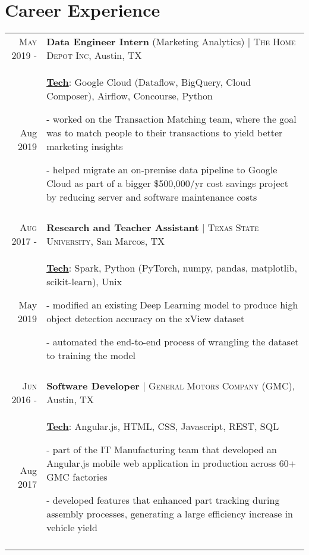 \documentclass[a4paper,10pt]{article}
\begin{document}
\section{Career Experience}
\begin{tabular}{r|p{12cm}}

\textsc{May 2019 -} & \textbf{Data Engineer Intern} (Marketing Analytics) | \textsc{The Home Depot Inc}, Austin, TX \\
Aug 2019 & \small{
	\textbf{\underline{Tech}}: Google Cloud (Dataflow, BigQuery, Cloud Composer), Airflow, Concourse, Python}

	\tiny{
	\vphantom{a}
	}
	
	\small{
	- worked on the Transaction Matching team, where the goal was to match people to their transactions to yield better marketing insights
	
	- helped migrate an on-premise data pipeline to Google Cloud as part of a bigger \$500,000/yr cost savings project by reducing server and software maintenance costs } \\
 \multicolumn{2}{c}{} \\

\textsc{Aug 2017 -} & \textbf{Research and Teacher Assistant} | \textsc{Texas State University}, San Marcos, TX \\
May 2019 & \small{
	\textbf{\underline{Tech}}: Spark, Python (PyTorch, numpy, pandas, matplotlib, scikit-learn), Unix
	}

	\tiny{
	\vphantom{a}
	}

	\small{
	
	- modified an existing Deep Learning model to produce high object detection accuracy on the xView dataset
	
	- automated the end-to-end process of wrangling the dataset to training the model
	}
	\\
 \multicolumn{2}{c}{} \\
 
 \textsc{Jun 2016 -} & \textbf{Software Developer} | \textsc{General Motors Company (GMC)}, Austin, TX \\
Aug 2017 & \small{
	\textbf{\underline{Tech}}: Angular.js, HTML, CSS, Javascript, REST, SQL}

	\tiny{
	\vphantom{a}
	}
	
	\small{
	- part of the IT Manufacturing team that developed an Angular.js mobile web application in production across 60+ GMC factories 
	
	- developed features that enhanced part tracking during assembly processes, generating a large efficiency increase in vehicle yield
} \\
 \multicolumn{2}{c}{} \\
 
\end{tabular}
\end{document}
